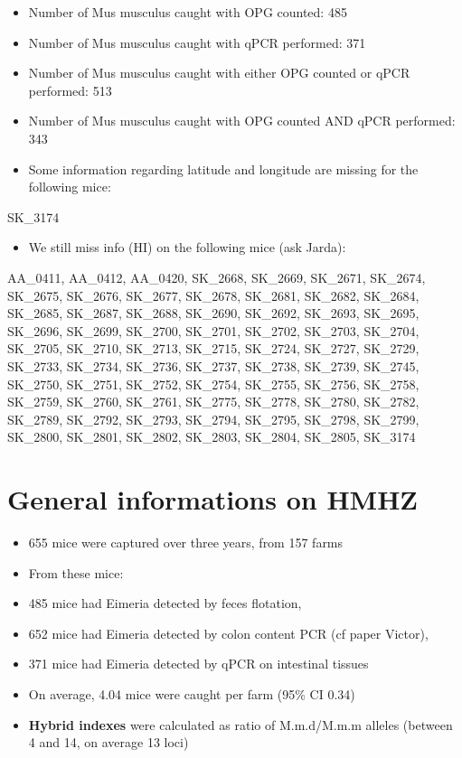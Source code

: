 \documentclass[]{article}
\providecommand{\tightlist}{%
  \setlength{\itemsep}{0pt}\setlength{\parskip}{0pt}}
\begin{document}
\begin{itemize}
\item
  Number of Mus musculus caught with OPG counted: 485
\item
  Number of Mus musculus caught with qPCR performed: 371
\item
  Number of Mus musculus caught with either OPG counted or qPCR
  performed: 513
\item
  Number of Mus musculus caught with OPG counted AND qPCR performed: 343
\item
  Some information regarding latitude and longitude are missing for the
  following mice:
\end{itemize}

SK\_3174

\begin{itemize}
\tightlist
\item
  We still miss info (HI) on the following mice (ask Jarda):
\end{itemize}

AA\_0411, AA\_0412, AA\_0420, SK\_2668, SK\_2669, SK\_2671, SK\_2674,
SK\_2675, SK\_2676, SK\_2677, SK\_2678, SK\_2681, SK\_2682, SK\_2684,
SK\_2685, SK\_2687, SK\_2688, SK\_2690, SK\_2692, SK\_2693, SK\_2695,
SK\_2696, SK\_2699, SK\_2700, SK\_2701, SK\_2702, SK\_2703, SK\_2704,
SK\_2705, SK\_2710, SK\_2713, SK\_2715, SK\_2724, SK\_2727, SK\_2729,
SK\_2733, SK\_2734, SK\_2736, SK\_2737, SK\_2738, SK\_2739, SK\_2745,
SK\_2750, SK\_2751, SK\_2752, SK\_2754, SK\_2755, SK\_2756, SK\_2758,
SK\_2759, SK\_2760, SK\_2761, SK\_2775, SK\_2778, SK\_2780, SK\_2782,
SK\_2789, SK\_2792, SK\_2793, SK\_2794, SK\_2795, SK\_2798, SK\_2799,
SK\_2800, SK\_2801, SK\_2802, SK\_2803, SK\_2804, SK\_2805, SK\_3174

\section{General informations on
HMHZ}\label{general-informations-on-hmhz-1}

\begin{itemize}
\item
  655 mice were captured over three years, from 157 farms
\item
  From these mice:
\item
  485 mice had Eimeria detected by feces flotation,
\item
  652 mice had Eimeria detected by colon content PCR (cf paper Victor),
\item
  371 mice had Eimeria detected by qPCR on intestinal tissues
\item
  On average, 4.04 mice were caught per farm (95\% CI 0.34)
\item
  \textbf{Hybrid indexes} were calculated as ratio of M.m.d/M.m.m
  alleles (between 4 and 14, on average 13 loci)
\end{itemize}
\end{document}

